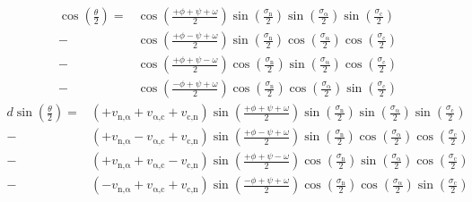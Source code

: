 \documentclass[fleqn,10pt]{wlpeerj} %
\begin{document}
\begin{align}
\cos\left(\frac{\theta}{2}\right) =&\cos\left(\frac{+\phi+\psi+\omega}{2}\right) \sin\left(\frac{\sigma_\textrm{n}}{2}\right) \sin\left(\frac{\sigma_\upalpha}{2}\right) \sin\left(\frac{\sigma_\textrm{c}}{2}\right) \nonumber \\
                                  -&\cos\left(\frac{+\phi-\psi+\omega}{2}\right) \sin\left(\frac{\sigma_\textrm{n}}{2}\right) \cos\left(\frac{\sigma_\upalpha}{2}\right) \cos\left(\frac{\sigma_\textrm{c}}{2}\right) \nonumber \\
                                  -&\cos\left(\frac{+\phi+\psi-\omega}{2}\right) \cos\left(\frac{\sigma_\textrm{n}}{2}\right) \sin\left(\frac{\sigma_\upalpha}{2}\right) \cos\left(\frac{\sigma_\textrm{c}}{2}\right) \nonumber \\
                                  -&\cos\left(\frac{-\phi+\psi+\omega}{2}\right) \cos\left(\frac{\sigma_\textrm{n}}{2}\right) \cos\left(\frac{\sigma_\upalpha}{2}\right) \sin\left(\frac{\sigma_\textrm{c}}{2}\right)
                                  \label{eqn:theta}
\end{align}
\begin{align} 
d \sin\left(\frac{\theta}{2}\right) = & \left(+v_{\textrm{n,}\upalpha}+v_{\upalpha\textrm{,c}}+v_\textrm{c,n}\right)\sin\left(\frac{+\phi+\psi+\omega}{2}\right)\sin\left(\frac{\sigma_\textrm{n}}{2}\right)\sin\left(\frac{\sigma_\upalpha}{2}\right)\sin\left(\frac{\sigma_\textrm{c}}{2}\right)\nonumber \\
                                    - & \left(+v_{\textrm{n,}\upalpha}-v_{\upalpha\textrm{,c}}+v_\textrm{c,n}\right)\sin\left(\frac{+\phi-\psi+\omega}{2}\right)\sin\left(\frac{\sigma_\textrm{n}}{2}\right)\cos\left(\frac{\sigma_\upalpha}{2}\right)\cos\left(\frac{\sigma_\textrm{c}}{2}\right)\nonumber \\
                                    - & \left(+v_{\textrm{n,}\upalpha}+v_{\upalpha\textrm{,c}}-v_\textrm{c,n}\right)\sin\left(\frac{+\phi+\psi-\omega}{2}\right)\cos\left(\frac{\sigma_\textrm{n}}{2}\right)\sin\left(\frac{\sigma_\upalpha}{2}\right)\cos\left(\frac{\sigma_\textrm{c}}{2}\right)\nonumber \\
                                    - & \left(-v_{\textrm{n,}\upalpha}+v_{\upalpha\textrm{,c}}+v_\textrm{c,n}\right)\sin\left(\frac{-\phi+\psi+\omega}{2}\right)\cos\left(\frac{\sigma_\textrm{n}}{2}\right)\cos\left(\frac{\sigma_\upalpha}{2}\right)\sin\left(\frac{\sigma_\textrm{c}}{2}\right)
                                    \label{eqn:d}
\end{align}
\end{document}
